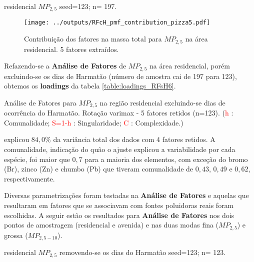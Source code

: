 \begin{table}[H]
  \centering
    
    \caption{residencial $MP_{2,5}$ seed=123; n= 197. 
             \label{table:RFcH_profiles5}}
\end{table}

\begin{figure}[H]
\centering
  \texttt{[image: ../outputs/RFcH\_pmf\_contribution\_pizza5.pdf]}
  \caption{Contribuição dos fatores na massa total para $MP_{2,5}$ na área
           residencial. 5 fatores extraídos.
          \label{table:RFcH_contribution5}}
\end{figure}

Refazendo-se a \textbf{Análise de Fatores} de $MP_{2,5}$ na área residencial, 
porém excluindo-se os dias de Harmatão (número de amostra cai de 197 para 123), 
obtemos os \textbf{loadings} da tabela \ref{table:loadings_RFsH6}. 

\begin{table}[H]
  
  \caption{Análise de Fatores para $MP_{2,5}$ na região residencial
           excluindo-se dias de ocorrência do Harmatão.
           Rotação varimax - 5 fatores retidos (n=123).
           (\textcolor{red}{h} : Comunalidade; 
           \textcolor{red}{S=1-h} : Singularidade; 
           \textcolor{red}{C} : Complexidade.)
           \label{table:loadings_RFsH5}}
\end{table}

explicou $84,0\%$ da variância
total dos dados com 4 fatores retidos.
A comunalidade, indicação do quão o ajuste explicou a variabilidade por 
cada espécie, foi maior que $0,7$ para a maioria dos elementos,
com exceção do bromo (Br), zinco (Zn) e chumbo (Pb) que tiveram comunalidade 
de $0,43$, $0,49$ e $0,62$, respectivamente.

Diversas parametrizações foram testadas na \textbf{Análise de Fatores}
e aquelas que resultaram em fatores que se associavam com fontes poluidoras
reais foram escolhidas. A seguir estão os resultados para 
\textbf{Análise de Fatores} nos dois pontos de amostragem 
(residencial e avenida) e nas duas modas
fina ($MP_{2,5}$) e grossa ($MP_{2,5-10}$).

\begin{table}[H]
  \centering
    
    \caption{residencial $MP_{2,5}$ removendo-se os dias do Harmatão 
              seed=123; n= 123. 
             \label{table:RFsH_profiles5}}
\end{table}

